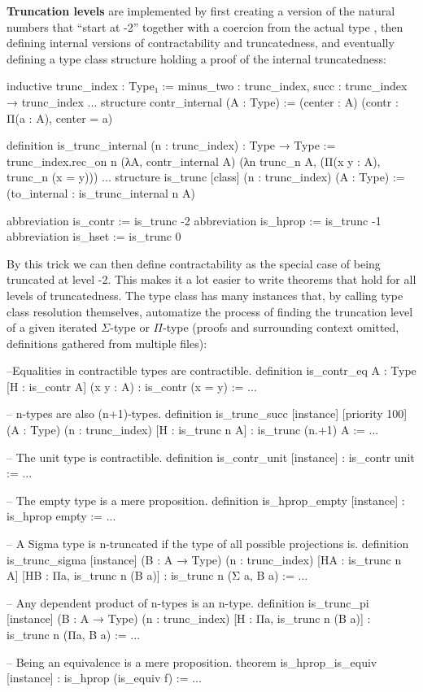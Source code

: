 \textbf{Truncation levels} are implemented by first creating a version of the natural
numbers that ``start at -2'' together with a coercion from the actual type
, then defining internal versions of contractability and truncatedness,
and eventually defining a type class structure holding a proof of the internal
truncatedness:
\begin{leancodebr}
inductive trunc_index : Type₁ :=
  minus_two : trunc_index,
  succ : trunc_index → trunc_index
...
structure contr_internal (A : Type) :=
  (center : A)
  (contr : Π(a : A), center = a)

definition is_trunc_internal (n : trunc_index) : Type → Type :=
trunc_index.rec_on n (λA, contr_internal A)
  (λn trunc_n A, (Π(x y : A), trunc_n (x = y)))
...
structure is_trunc [class] (n : trunc_index) (A : Type) :=
  (to_internal : is_trunc_internal n A)

abbreviation is_contr := is_trunc -2
abbreviation is_hprop := is_trunc -1
abbreviation is_hset  := is_trunc 0
\end{leancodebr}
By this trick we can then define contractability as the special case of being 
truncated at level -2.
This makes it a lot easier to write theorems that hold for all levels of
truncatedness.
The type class  has many instances that, by calling type class
resolution themselves, automatize the process of finding the truncation level
of a given iterated $\Sigma$-type or $\Pi$-type (proofs and surrounding
context omitted, definitions gathered from multiple files):
\begin{leancodebr}
--Equalities in contractible types are contractible.
definition is_contr_eq {A : Type} [H : is_contr A] (x y : A) :
  is_contr (x = y) := ...

-- n-types are also (n+1)-types.
definition is_trunc_succ [instance] [priority 100] 
  (A : Type) (n : trunc_index) [H : is_trunc n A] : is_trunc (n.+1) A := ...

-- The unit type is contractible.
definition is_contr_unit [instance] : is_contr unit := ...

-- The empty type is a mere proposition.
definition is_hprop_empty [instance] : is_hprop empty := ...

-- A Sigma type is n-truncated if the type of all possible projections is.
definition is_trunc_sigma [instance] (B : A → Type) (n : trunc_index)
  [HA : is_trunc n A] [HB : Πa, is_trunc n (B a)] :
  is_trunc n (Σ a, B a) := ...
  
-- Any dependent product of n-types is an n-type.
definition is_trunc_pi [instance] (B : A → Type) (n : trunc_index)
  [H : Πa, is_trunc n (B a)] : is_trunc n (Πa, B a) := ...
  
-- Being an equivalence is a mere proposition.
theorem is_hprop_is_equiv [instance] : is_hprop (is_equiv f) := ...
\end{leancodebr}

